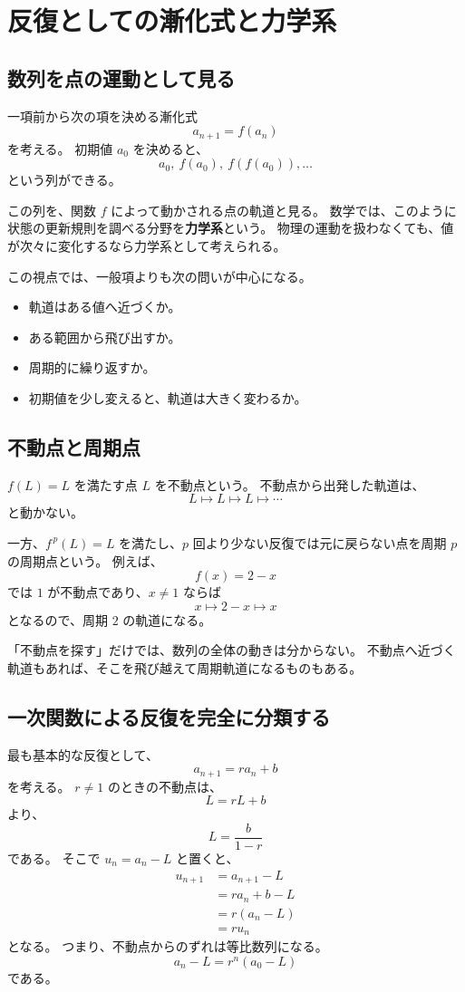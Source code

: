 \section{反復としての漸化式と力学系}

\subsection{数列を点の運動として見る}

一項前から次の項を決める漸化式
\[
  a_{n+1}=f(a_n)
\]
を考える。
初期値 $a_0$ を決めると、
\[
  a_0,\ f(a_0),\ f(f(a_0)),\ldots
\]
という列ができる。

この列を、関数 $f$ によって動かされる点の軌道と見る。
数学では、このように状態の更新規則を調べる分野を\textbf{力学系}という。
物理の運動を扱わなくても、値が次々に変化するなら力学系として考えられる。

この視点では、一般項よりも次の問いが中心になる。

\begin{itemize}
  \item 軌道はある値へ近づくか。
  \item ある範囲から飛び出すか。
  \item 周期的に繰り返すか。
  \item 初期値を少し変えると、軌道は大きく変わるか。
\end{itemize}

\subsection{不動点と周期点}

$f(L)=L$ を満たす点 $L$ を不動点という。
不動点から出発した軌道は、
\[
  L\longmapsto L\longmapsto L\longmapsto\cdots
\]
と動かない。

一方、$f^{\,p}(L)=L$ を満たし、$p$ 回より少ない反復では元に戻らない点を周期 $p$ の周期点という。
例えば、
\[
  f(x)=2-x
\]
では $1$ が不動点であり、$x\neq1$ ならば
\[
  x\longmapsto 2-x\longmapsto x
\]
となるので、周期 $2$ の軌道になる。

「不動点を探す」だけでは、数列の全体の動きは分からない。
不動点へ近づく軌道もあれば、そこを飛び越えて周期軌道になるものもある。

\subsection{一次関数による反復を完全に分類する}

最も基本的な反復として、
\[
  a_{n+1}=ra_n+b
\]
を考える。
$r\neq1$ のときの不動点は、
\[
  L=rL+b
\]
より、
\[
  L=\frac{b}{1-r}
\]
である。
そこで $u_n=a_n-L$ と置くと、
\[
\begin{aligned}
  u_{n+1}
  &=a_{n+1}-L\\
  &=ra_n+b-L\\
  &=r(a_n-L)\\
  &=ru_n
\end{aligned}
\]
となる。
つまり、不動点からのずれは等比数列になる。
\[
  a_n-L=r^n(a_0-L)
\]
である。

